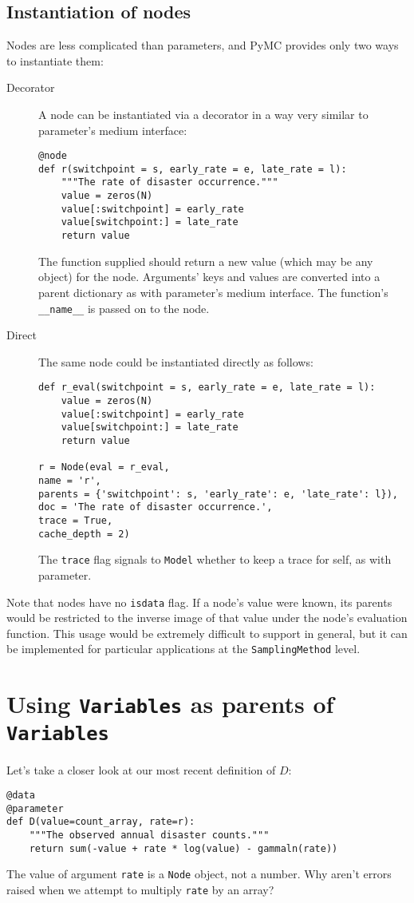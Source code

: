 \subsection{Instantiation of nodes}
Nodes are less complicated than parameters, and PyMC provides only two ways to instantiate them:
\begin{description}
    \item[Decorator] A node can be instantiated via a decorator in a way very similar to parameter's medium interface:
\begin{verbatim}
@node
def r(switchpoint = s, early_rate = e, late_rate = l):
    """The rate of disaster occurrence."""
    value = zeros(N)
    value[:switchpoint] = early_rate
    value[switchpoint:] = late_rate
    return value
\end{verbatim}
The function supplied should return a new value (which may be any object) for the node. Arguments' keys and values are converted into a parent dictionary as with parameter's medium interface. The function's \texttt{\_\_name\_\_} is passed on to the node.
    \item[Direct] The same node could be instantiated directly as follows:
\begin{verbatim}
def r_eval(switchpoint = s, early_rate = e, late_rate = l):
    value = zeros(N)
    value[:switchpoint] = early_rate
    value[switchpoint:] = late_rate
    return value

r = Node(eval = r_eval, 
name = 'r',
parents = {'switchpoint': s, 'early_rate': e, 'late_rate': l}),
doc = 'The rate of disaster occurrence.',
trace = True,
cache_depth = 2)
\end{verbatim}
The \texttt{trace} flag signals to \texttt{Model} whether to keep a trace for self, as with parameter.
\end{description}

Note that nodes have no \texttt{isdata} flag. If a node's value were known, its parents would be restricted to the inverse image of that value under the node's evaluation function. This usage would be extremely difficult to support in general, but it can be implemented for particular applications at the \texttt{SamplingMethod} level.

\section{Using \texttt{Variables} as parents of \texttt{Variables}}

Let's take a closer look at our most recent definition of $D$:
\begin{verbatim}
@data
@parameter
def D(value=count_array, rate=r):
    """The observed annual disaster counts."""
    return sum(-value + rate * log(value) - gammaln(rate))
\end{verbatim}
The value of argument \texttt{rate} is a \texttt{Node} object, not a number. Why aren't errors raised when we attempt to multiply \texttt{rate} by an array?

